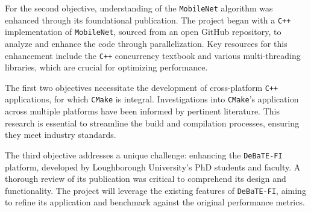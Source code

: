 For the second objective, understanding of the \texttt{MobileNet} algorithm was enhanced through its foundational publication\cite{mobilenet_paper}. The project began with a \texttt{C++} implementation of \texttt{MobileNet}, sourced from an open GitHub repository\cite{mobilenet_repo}, to analyze and enhance the code through parallelization. Key resources for this enhancement include the \texttt{C++} concurrency textbook\cite{c++_concurrency_in_action} and various multi-threading libraries\cite{openmp_usage_hpc}, which are crucial for optimizing performance.

The first two objectives necessitate the development of cross-platform \texttt{C++} applications, for which \texttt{CMake} is integral. Investigations into \texttt{CMake}'s application across multiple platforms have been informed by pertinent literature\cite{cmake_publication_1}\cite{cmake_publication_2}. This research is essential to streamline the build and compilation processes, ensuring they meet industry standards.

The third objective addresses a unique challenge: enhancing the \texttt{DeBaTE-FI} platform, developed by Loughborough University’s PhD students and faculty. A thorough review of its publication was critical to comprehend its design and functionality. The project will leverage the existing features of \texttt{DeBaTE-FI}, aiming to refine its application and benchmark against the original performance metrics. 


